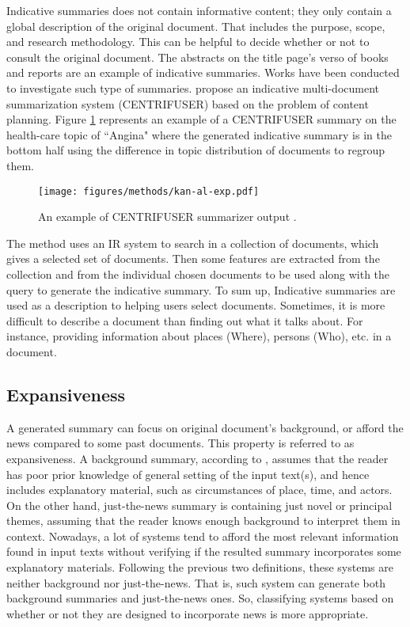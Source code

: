 Indicative summaries does not contain informative content; they only contain a global description of the original document. 
That includes the purpose, scope, and research methodology. 
This can be helpful to decide whether or not to consult the original document. 
The abstracts on the title page's verso of books and reports are an example of indicative summaries. 
Works have been conducted to investigate such type of summaries.
\citet{01-kan-al} propose an indicative multi-document summarization system (CENTRIFUSER) based on the problem of content planning. 
Figure \ref{fig:kan-al-exp} represents an example of a CENTRIFUSER summary on the health-care topic of ``Angina" where the generated indicative summary is in the bottom half using the difference in topic distribution of documents to regroup them.
%
\begin{figure}[ht]
	\begin{center}
		\texttt{[image: figures/methods/kan-al-exp.pdf]} %
		\caption{An example of CENTRIFUSER summarizer output \citep{01-kan-al}.}
		\label{fig:kan-al-exp}
	\end{center}
\end{figure}
The method uses an IR system to search in a collection of documents, which gives a selected set of documents. 
Then some features are extracted from the collection and from the individual chosen documents to be used along with the query to generate the indicative summary.
To sum up, Indicative summaries are used as a description to helping users select documents. 
Sometimes, it is more difficult to describe a document than finding out what it talks about. 
For instance, providing information about places (Where), persons (Who), etc. in a document.

\subsection{Expansiveness}

A generated summary can focus on original document's background, or afford the news compared to some past documents.
This property is referred to as expansiveness. 
A background summary, according to \citet{01-mani}, assumes that the reader has poor prior knowledge of general setting of the input text(s), and hence includes explanatory material, such as circumstances of place, time, and actors.
On the other hand, just-the-news summary is containing just novel or principal themes, assuming that the reader
knows enough background to interpret them in context. 
Nowadays, a lot of systems tend to afford the most relevant information found in input texts without verifying if the resulted summary incorporates some explanatory materials. 
Following the previous two definitions, these systems are neither background nor just-the-news. 
That is, such system can generate both background summaries and just-the-news ones. 
So, classifying systems based on whether or not they are designed to incorporate news is more appropriate.

